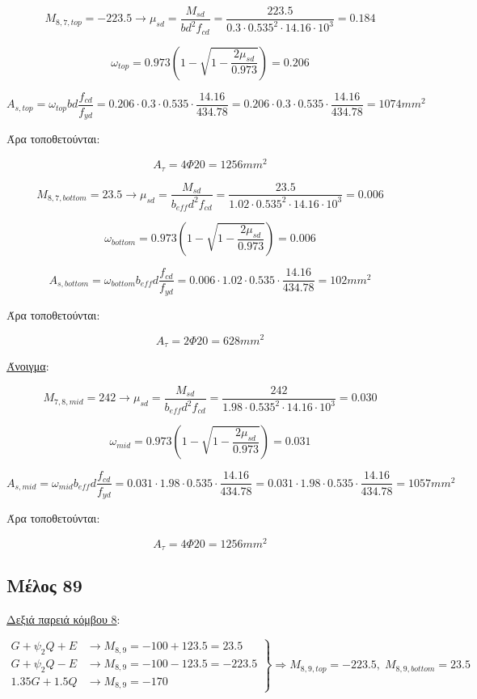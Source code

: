 \[
M_{8,7,top} = -223.5 \rightarrow \mu_{sd} = \dfrac{M_{sd}}{b d^2 f_{cd}} = \dfrac{223.5}{0.3\cdot0.535^2\cdot14.16\cdot10^3} = 0.184
\]

\[
\omega_{top} = 0.973\left( 1 - \sqrt{1 - \dfrac{2\mu_{sd}}{0.973}} \right) = 0.206
\]

\[
A_{s,top} = \omega_{top}b d \dfrac{f_{cd}}{f_{yd}} = 0.206\cdot 0.3 \cdot 0.535 \cdot \dfrac{14.16}{434.78} = 0.206\cdot 0.3 \cdot 0.535 \cdot \dfrac{14.16}{434.78} = 1074mm^2
\]

\noindent
Άρα τοποθετούνται:

\[
A_{\tau} = 4\Phi20 = 1256mm^2
\]

\[
M_{8,7,bottom} = 23.5 \rightarrow \mu_{sd} = \dfrac{M_{sd}}{b_{eff} d^2 f_{cd}} = \dfrac{23.5}{1.02\cdot0.535^2\cdot14.16\cdot10^3} = 0.006
\]

\[
\omega_{bottom} = 0.973\left( 1 - \sqrt{1 - \dfrac{2\mu_{sd}}{0.973}} \right) = 0.006
\]

\[
A_{s,bottom} = \omega_{bottom}b_{eff} d \dfrac{f_{cd}}{f_{yd}} = 0.006\cdot 1.02 \cdot 0.535 \cdot \dfrac{14.16}{434.78} = 102mm^2
\]

\noindent
Άρα τοποθετούνται:

\[
A_{\tau} = 2\Phi20 = 628mm^2
\]

\noindent
\underline{Άνοιγμα}:

\bigskip

\[
M_{7,8,mid} = 242 \rightarrow \mu_{sd} = \dfrac{M_{sd}}{b_{eff} d^2 f_{cd}} = \dfrac{242}{1.98\cdot0.535^2\cdot14.16\cdot10^3} = 0.030
\]

\[
\omega_{mid} = 0.973\left( 1 - \sqrt{1 - \dfrac{2\mu_{sd}}{0.973}} \right) = 0.031
\]

\[
A_{s,mid} = \omega_{mid}b_{eff} d \dfrac{f_{cd}}{f_{yd}} = 0.031\cdot 1.98 \cdot 0.535 \cdot \dfrac{14.16}{434.78} = 0.031\cdot 1.98 \cdot 0.535 \cdot \dfrac{14.16}{434.78} = 1057 mm^2
\]

\noindent
Άρα τοποθετούνται:

\[
A_{\tau} = 4\Phi20 = 1256 mm^2
\]

\subsection{Μέλος 89}

\noindent
\underline{Δεξιά παρειά κόμβου 8}:

\[
\left.
   \begin{array}{ll}
       G+\psi_2 Q + Ε & \rightarrow M_{8,9} = -100+123.5 = 23.5 \\
       G+\psi_2 Q - Ε & \rightarrow M_{8,9} = -100-123.5 = -223.5 \\
       1.35G + 1.5Q     & \rightarrow M_{8,9} = -170
   \end{array}
\right \} \Rightarrow M_{8,9,top} = -223.5,\; M_{8,9,bottom} = 23.5
\]

